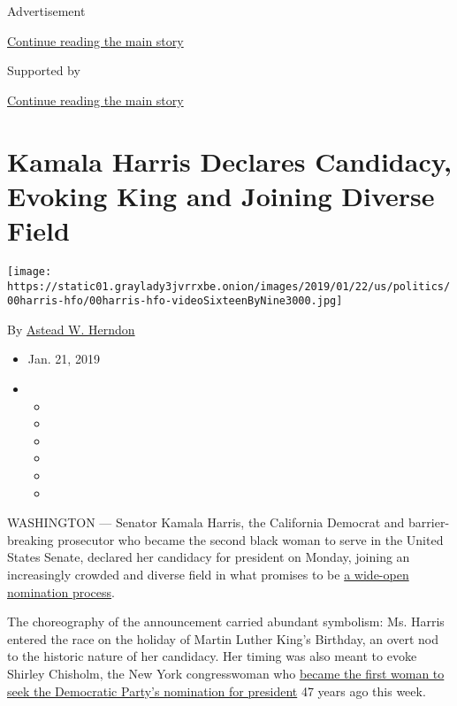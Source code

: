 Advertisement

\protect\hyperlink{after-top}{Continue reading the main story}

Supported by

\protect\hyperlink{after-sponsor}{Continue reading the main story}

\hypertarget{kamala-harris-declares-candidacy-evoking-king-and-joining-diverse-field}{%
\section{Kamala Harris Declares Candidacy, Evoking King and Joining
Diverse
Field}\label{kamala-harris-declares-candidacy-evoking-king-and-joining-diverse-field}}

\texttt{[image: https://static01.graylady3jvrrxbe.onion/images/2019/01/22/us/politics/00harris-hfo/00harris-hfo-videoSixteenByNine3000.jpg]}

By \href{https://www.nytimes3xbfgragh.onion/by/astead-w-herndon}{Astead
W. Herndon}

\begin{itemize}
\item
  Jan. 21, 2019
\item
  \begin{itemize}
  \item
  \item
  \item
  \item
  \item
  \item
  \end{itemize}
\end{itemize}

WASHINGTON --- Senator Kamala Harris, the California Democrat and
barrier-breaking prosecutor who became the second black woman to serve
in the United States Senate, declared her candidacy for president on
Monday, joining an increasingly crowded and diverse field in what
promises to be
\href{https://www.nytimes3xbfgragh.onion/2018/12/31/us/politics/2020-democratic-candidates.html}{a
wide-open nomination process}.

The choreography of the announcement carried abundant symbolism: Ms.
Harris entered the race on the holiday of Martin Luther King's Birthday,
an overt nod to the historic nature of her candidacy. Her timing was
also meant to evoke Shirley Chisholm, the New York congresswoman who
\href{https://www.nytimes3xbfgragh.onion/2005/01/03/obituaries/shirley-chisholm-unbossedpioneer-in-congress-is-dead-at-80.html}{became
the first woman to seek the Democratic Party's nomination for president}
47 years ago this week.

